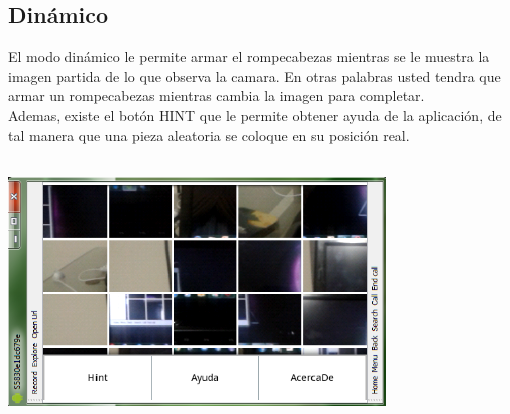 \documentclass[10pt]{article}
\begin{document}
	\subsection{Din\'amico}
		El modo din\'amico le permite armar el rompecabezas mientras se le muestra la imagen partida de lo que observa la camara. En otras palabras
		usted tendra que armar un rompecabezas mientras cambia la imagen para completar.
	\\Ademas, existe el bot\'on HINT que le permite obtener ayuda de la aplicaci\'on, de tal manera que una pieza aleatoria se coloque en su posici\'on real.
	\begin{center}
	\includegraphics[height=7cm,width=10cm]{hint.png}
	\end{center}	
\end{document}
